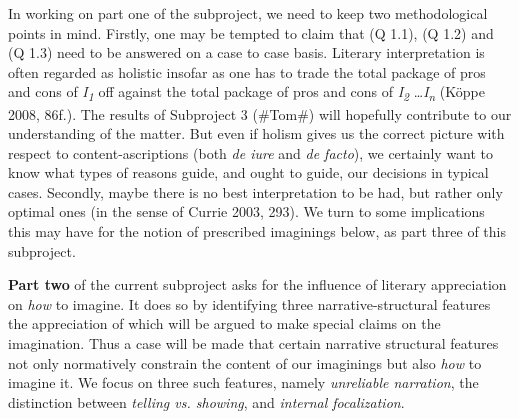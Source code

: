 \noindent In working on part one of the subproject, we need to keep two
methodological points in mind. Firstly, one may be tempted to claim that
(Q 1.1), (Q 1.2) and (Q 1.3) need to be answered on a case to case
basis. Literary interpretation is often regarded as holistic insofar as
one has to trade the total package of pros and cons of
\emph{I\textsubscript{1}} off against the total package of pros and cons
of \emph{I\textsubscript{2}} \ldots \emph{I\textsubscript{n}} (K\"oppe
2008, 86f.). The results of {Subproject 3 (\#Tom\#)} will hopefully
contribute to our understanding of the matter. But even if holism gives
us the correct picture with respect to content-ascriptions (both
\emph{de iure} and \emph{de facto}), we certainly want to know what
types of reasons guide, and ought to guide, our decisions in typical
cases. Secondly, maybe there is no best interpretation to be had, but
rather only optimal ones (in the sense of Currie 2003, 293). We turn to
some implications this may have for the notion of prescribed imaginings
below, as part three of this subproject.

\textbf{Part two} of the current subproject asks for the influence of
literary appreciation on \emph{how} to imagine. It does so by
identifying three narrative-structural features the appreciation of
which will be argued to make special claims on the imagination. Thus a
case will be made that certain narrative structural features not only
normatively constrain the content of our imaginings but also \emph{how}
to imagine it. We focus on three such features, namely \emph{unreliable
narration}, the distinction between \emph{telling vs. showing}, and
\emph{internal focalization}.

